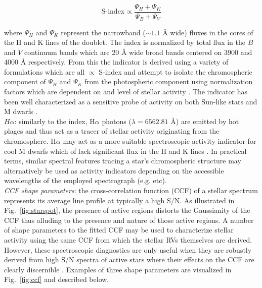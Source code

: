 \begin{equation}
  \text{S-index} \propto \frac{\Psi_H + \Psi_K}{\Psi_B + \Psi_V}
\end{equation}

\noindent where $\Psi_H$ and $\Psi_K$ represent the narrowband
($\sim 1.1$ \AA{} wide) fluxes in the cores of the H and K lines of the \caii{}
doublet. The index is normalized by total flux in the $B$ and $V$ continuum bands
which are 20 \AA{} wide broad bands centered on 3900 and 4000 \AA{} respectively.
From this the \Rhk{} indicator is derived using a variety of formulations which are
all $\propto$ S-index and attempt to isolate the chromospheric component of
$\Psi_H$ and $\Psi_K$ from the photospheric component using normalization factors
which are dependent on \teff{} and level of stellar activity \citep{lovis11}. The
\Rhk{} indicator has been well characterized as a sensitive probe of activity on
both Sun-like stars and M dwarfs
\citep[e.g.][]{wright04,lovis11,astudillodefru17b}. \\

$H\alpha$: 
similarly to the \Rhk{} index, H$\alpha$ photons ($\lambda = 6562.81$ \AA{)} are emitted by
hot plages and thus act as a tracer of stellar activity originating from the chromosphere.
H$\alpha$ may act as a more suitable spectroscopic activity indicator for cool M dwarfs
which of lack significant flux in the \caii{} H and K lines \citep{robertson14}.
In practical terms,  
similar spectral features tracing a star's chromospheric structure may alternatively be used
as activity indicators depending on the accessible wavelengths of the employed spectrograph
(e.g. \hei{,} \nai{,} etc). \\


\emph{CCF shape parameters}:
the cross-correlation function (CCF) of a stellar spectrum represents its average line profile
at typically a high S/N.
As illustrated in Fig.~\ref{fig:starspot}, the presence of active regions distorts
the Gaussianity of the CCF thus alluding to the presence and nature of those active regions.
A number of shape parameters to the fitted CCF may be used to characterize stellar activity
using the same CCF from which the stellar RVs themselves are derived. However, these
spectroscopic diagnostics are only useful when they are robustly derived from high S/N
spectra of active stars where their effects on the CCF are clearly discernible \citep{desort07}.
Examples of three
shape parameters are visualized in Fig.~\ref{fig:ccf} and described below. \\


